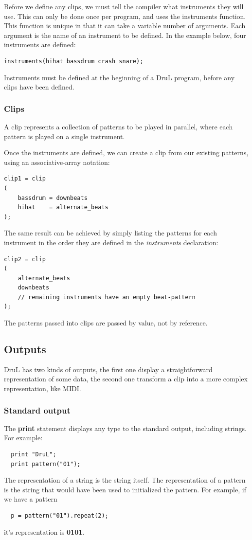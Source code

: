 \documentclass[11pt,twoside]{article}
\begin{document}
Before we define any clips, we must tell the compiler what instruments they will use.
This can only be done once per program, and uses the instruments function.  This function is unique in that it can take a variable number of arguments.  Each argument is the name of an instrument to be defined.  In the example below, four instruments are defined:

\begin{verbatim}
instruments(hihat bassdrum crash snare);
\end{verbatim}

Instruments must be defined at the beginning of a DruL program, before any clips have been defined.

\subsubsection{Clips}

A clip represents a collection of patterns to be played in parallel, where each pattern is played on a single instrument.

Once the instruments are defined, we can create a clip from our existing patterns, using an
associative-array notation:

\begin{verbatim}
clip1 = clip
(
    bassdrum = downbeats
    hihat    = alternate_beats
);
\end{verbatim}
The same result can be achieved by simply listing the patterns for each instrument in the order they are defined in the \textit{instruments} declaration:
\begin{verbatim}
clip2 = clip
(
    alternate_beats
    downbeats
    // remaining instruments have an empty beat-pattern
);

\end{verbatim}
The patterns passed into clips are passed by value, not by reference.



\subsection{Outputs}
DruL has two kinds of outputs, the first one display a straightforward
representation of some data, the second one transform a clip into a
more complex representation, like MIDI.

\subsubsection{Standard output}
The \textbf{print} statement displays any type to the standard
output, including strings. For example:
\begin{verbatim}
  print "DruL";
  print pattern("01");
\end{verbatim}
The representation of a string is the string itself. The representation
of a pattern is the string that would have been used to initialized
the pattern. For example, if we have a pattern
\begin{verbatim}
  p = pattern("01").repeat(2);
\end{verbatim}
it's representation is \textbf{0101}.
\end{document}
